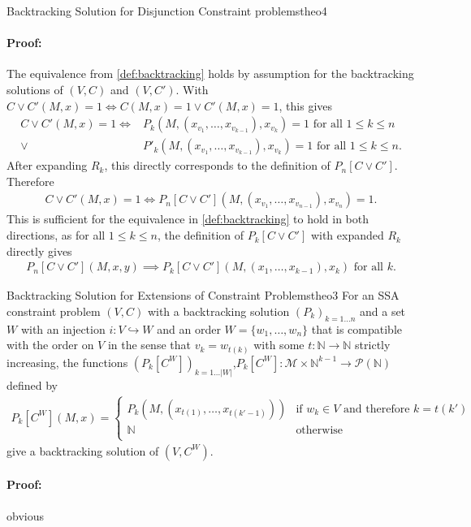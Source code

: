\begin{theorem}{Backtracking Solution for Disjunction Constraint problems}{theo4}
    \paragraph*{Proof:} The equivalence from \autoref{def:backtracking}
                        holds by assumption for the backtracking solutions
                        of $(V,C)$ and $(V,C')$.
                        With $C\mathrel\lor C'(M,x)=1\iff C(M,x)=1\mathrel\lor C'(M,x)=1$,
                        this gives
    \begin{align*}
        C\mathrel\lor C'(M,x)=1\iff{}& P_k(M,(x_{v_1},\dots,x_{v_{k-1}}),x_{v_k})=1\text{ for all }1\leq k\leq n\\
                              \mathrel\lor{}& P'_k(M,(x_{v_1},\dots,x_{v_{k-1}}),x_{v_k})=1\text{ for all }1\leq k\leq n.
    \end{align*}
    After expanding $R_k$, this directly corresponds to the definition of
    $P_n[C\mathrel\lor C']$.
    Therefore
    \begin{align*}
        C\mathrel\lor C'(M,x)=1\iff{}P_n[C\mathrel\lor C'](M,(x_{v_1},\dots,x_{v_{n-1}}),x_{v_n})=1.
    \end{align*}
    This is sufficient for the equivalence in \autoref{def:backtracking} to hold
    in both directions, as for all $1\leq k\leq n$, the definition of
    $P_k[C\mathrel\lor C']$ with expanded $R_k$ directly gives
    \begin{align*}
        P_n[C\mathrel\lor C'](M,x,y)\implies P_k[C\mathrel\lor C'](M,(x_1,\dots,x_{k-1}),x_k)\text{ for all }k.
    \end{align*}
\end{theorem}
\begin{theorem}{Backtracking Solution for Extensions of Constraint Problems}{theo3}
    For an SSA constraint problem $(V,C)$ with a backtracking
    solution $(P_k)_{k=1\dots n}$ and a set $W$ with an injection
    $i:V\hookrightarrow W$ and an order $W=\{w_1,\dots,w_n\}$ that is
    compatible with the order on $V$ in the sense that $v_k=w_{t(k)}$ with
    some $t:\mathbb N\rightarrow\mathbb N$ strictly increasing, the functions
    $(P_k[C^W])_{k=1\dots |W|}$,$P_k[C^W]\colon\mathcal M\times\mathbb N^{k-1}\rightarrow\mathcal P(\mathbb N)$
    defined by
    \begin{align*}
        P_k[C^W](M,x)=\left\{
            \begin{array}{ll}
                P_k\left(M,\left(x_{t(1)},\dots,x_{t(k'-1)}\right)\right)&\text{if }w_k\in V\text{ and therefore }k=t(k')\\
                \mathbb N&\text{otherwise}\\
            \end{array}\right.
    \end{align*}
    give a backtracking solution of $(V,C^W)$.
    \tcblower
    \paragraph*{Proof:} obvious
\end{theorem}
